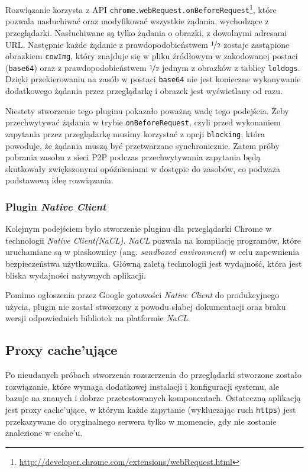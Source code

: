\documentclass[a4paper,11pt]{scrartcl}
\newcommand{\f}{\texttt}
\newcommand{\keszu}{cache'u}
\newcommand{\keszujace}{cache'ujące}
\begin{document}
Rozwiązanie korzysta z API \f{chrome.webRequest.onBeforeRequest}\footnote{\url{http://developer.chrome.com/extensions/webRequest.html}}, które pozwala nasłuchiwać oraz modyfikować wszystkie żądania, wychodzące z przeglądarki. Nasłuchiwane są tylko żądania o obrazki, z dowolnymi adresami URL. Następnie każde żądanie z prawdopodobieństwem $\nicefrac{1}{2}$ zostaje zastąpione obrazkiem \f{cowImg}, który znajduje się w pliku źródłowym w zakodowanej postaci (\f{base64}) oraz z prawdopodobieństwem $\nicefrac{1}{2}$ jednym z obrazków z tablicy \f{loldogs}. Dzięki przekierowaniu na zasób w postaci \f{base64} nie jest konieczne wykonywanie dodatkowego żądania przez przeglądarkę i obrazek jest wyświetlany od razu. 

Niestety stworzenie tego pluginu pokazało poważną wadę tego podejścia. Żeby przechwytywać żądania w trybie \f{onBeforeRequest}, czyli przed wykonaniem zapytania przez przeglądarkę musimy korzystać z opcji \f{blocking}, która powoduje, że żądania muszą być przetwarzane synchronicznie. Zatem próby pobrania zasobu z sieci P2P podczas przechwytywania zapytania będą skutkowały zwiększonymi opóźnieniami w dostępie do zasobów, co podważa podstawową ideę rozwiązania.

\subsubsection{Plugin \textit{Native Client}}
\label{sect_plugin_2}
Kolejnym podejściem było stworzenie pluginu dla przeglądarki Chrome w technologii \textit{Native Client(NaCL)}. \textit{NaCL} pozwala na kompilację programów, które uruchamiane są w piaskownicy (ang. \textit{sandboxed environment}) w celu zapewnienia bezpieczeństwa użytkownika. Główną zaletą technologii jest wydajność, która jest bliska wydajności natywnych aplikacji.

Pomimo ogłoszenia przez Google gotowości \textit{Native Client} do produkcyjnego użycia, plugin nie został stworzony z powodu słabej dokumentacji oraz braku wersji odpowiednich bibliotek na platformie \textit{NaCL}.

\subsection{Proxy \keszujace}
\label{sect_impl_proxy}
Po nieudanych próbach stworzenia rozszerzenia do przeglądarki stworzone zostało rozwiązanie, które wymaga dodatkowej instalacji i konfiguracji systemu, ale bazuje na znanych i dobrze przetestowanych komponentach. Ostateczną aplikacją jest proxy \keszujace, w którym każde zapytanie (wykluczając ruch \f{https}) jest przekazywane do oryginalnego serwera tylko w momencie, gdy nie zostanie znalezione w \keszu.
\end{document}
